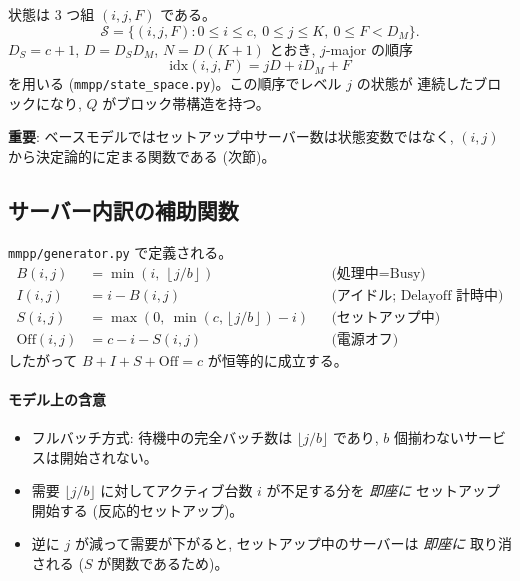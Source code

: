 \documentclass[a4paper,11pt]{article}
\newcommand{\code}[1]{\texttt{#1}}
\begin{document}
状態は 3 つ組 $(i,j,F)$ である。
\begin{equation}
  \mathcal{S}=\{(i,j,F): 0\le i\le c,\ 0\le j\le K,\ 0\le F<D_M\}.
\end{equation}
$D_S=c+1$, $D=D_S D_M$, $N=D(K+1)$ とおき, $j$-major の順序
\begin{equation}
  \mathrm{idx}(i,j,F)=jD+iD_M+F
  \label{eq:base-index}
\end{equation}
を用いる (\code{mmpp/state\_space.py})。この順序でレベル $j$ の状態が
連続したブロックになり, $Q$ がブロック帯構造を持つ。

\textbf{重要}: ベースモデルではセットアップ中サーバー数は状態変数ではなく,
$(i,j)$ から決定論的に定まる関数である (次節)。

\subsection{サーバー内訳の補助関数}

\code{mmpp/generator.py} で定義される。
\begin{align}
  B(i,j) &= \min\!\left(i,\ \left\lfloor j/b \right\rfloor\right)
  &&\text{(処理中=Busy)} \label{eq:B}\\
  I(i,j) &= i - B(i,j)
  &&\text{(アイドル; Delayoff 計時中)} \label{eq:I}\\
  S(i,j) &= \max\!\left(0,\ \min\!\left(c,\left\lfloor j/b\right\rfloor\right)-i\right)
  &&\text{(セットアップ中)} \label{eq:S}\\
  \mathrm{Off}(i,j) &= c - i - S(i,j)
  &&\text{(電源オフ)} \label{eq:Off}
\end{align}
したがって $B+I+S+\mathrm{Off}=c$ が恒等的に成立する。

\paragraph{モデル上の含意}
\begin{itemize}
  \item フルバッチ方式: 待機中の完全バッチ数は $\lfloor j/b\rfloor$ であり,
        $b$ 個揃わないサービスは開始されない。
  \item 需要 $\lfloor j/b\rfloor$ に対してアクティブ台数 $i$ が不足する分を
        \emph{即座に} セットアップ開始する (反応的セットアップ)。
  \item 逆に $j$ が減って需要が下がると, セットアップ中のサーバーは
        \emph{即座に} 取り消される ($S$ が関数であるため)。
\end{itemize}
\end{document}
